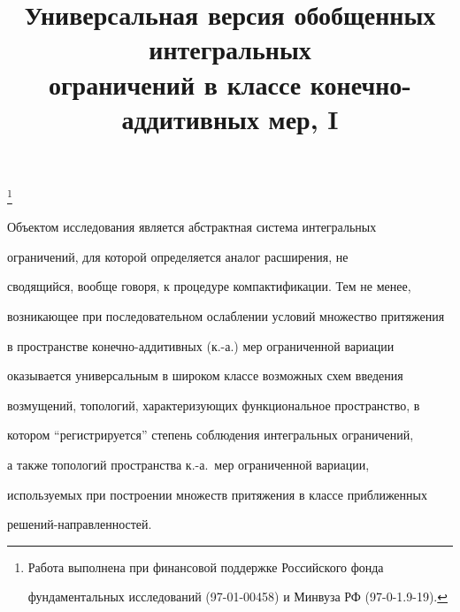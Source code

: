 \title{Универсальная версия обобщенных интегральных\\


ограничений в классе конечно-аддитивных мер, I}





\thanks{Работа выполнена при финансовой поддержке Российского фонда


фундаментальных исследований (97-01-00458) и Минвуза РФ (97-0-1.9-19).}





\date{}




\pagestyle{plain} %







\maketitle


\label{begin}





Объектом исследования является абстрактная система интегральных


ограничений, для которой определяется аналог расширения, не


сводящийся, вообще говоря, к процедуре компактификации. Тем не менее,


возникающее при последовательном ослаблении условий множество притяжения


в пространстве конечно-аддитивных (к.-а.) мер ограниченной вариации


оказывается универсальным в широком классе возможных схем введения


возмущений, топологий, характеризующих функциональное пространство, в


котором ``регистрируется'' степень соблюдения интегральных ограничений,


а также топологий пространства к.-а.~мер ограниченной вариации,


используемых при построении множеств притяжения в классе приближенных


решений-направленностей.





